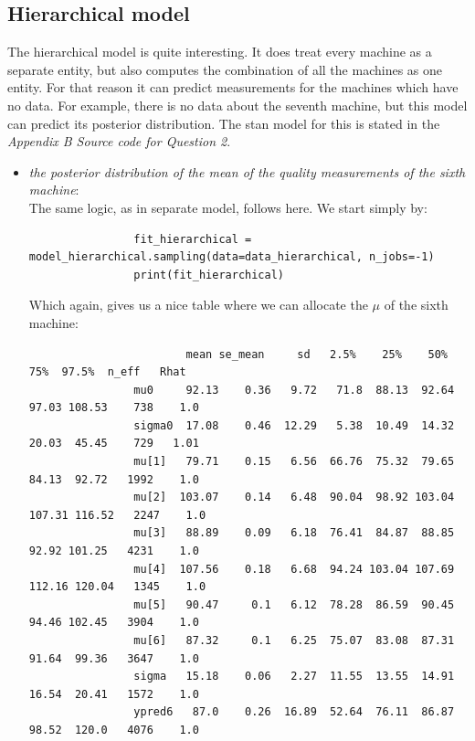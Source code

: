 \documentclass[11pt,a4paper,english]{article}
\begin{document}
        \subsection{Hierarchical model}
          The hierarchical model is quite interesting. It does treat every machine as a separate entity, but also computes the combination of all the machines as one entity. For that reason it can predict measurements for the machines which have no data. For example, there is no data about the seventh machine, but this model can predict its posterior distribution. The stan model for this is stated in the \textit{Appendix B  Source code for Question 2}.

          \begin{itemize}
            \item \textit{the posterior distribution of the mean of the quality measurements of the sixth machine}: \\
              The same logic, as in separate model, follows here. We start simply by:
              \begin{verbatim}
                fit_hierarchical = model_hierarchical.sampling(data=data_hierarchical, n_jobs=-1)
                print(fit_hierarchical)
              \end{verbatim}
              Which again, gives us a nice table where we can allocate the $\mu$ of the sixth machine:
              \begin{verbatim}
                        mean se_mean     sd   2.5%    25%    50%    75%  97.5%  n_eff   Rhat
                mu0     92.13    0.36   9.72   71.8  88.13  92.64  97.03 108.53    738    1.0
                sigma0  17.08    0.46  12.29   5.38  10.49  14.32  20.03  45.45    729   1.01
                mu[1]   79.71    0.15   6.56  66.76  75.32  79.65  84.13  92.72   1992    1.0
                mu[2]  103.07    0.14   6.48  90.04  98.92 103.04 107.31 116.52   2247    1.0
                mu[3]   88.89    0.09   6.18  76.41  84.87  88.85  92.92 101.25   4231    1.0
                mu[4]  107.56    0.18   6.68  94.24 103.04 107.69 112.16 120.04   1345    1.0
                mu[5]   90.47     0.1   6.12  78.28  86.59  90.45  94.46 102.45   3904    1.0
                mu[6]   87.32     0.1   6.25  75.07  83.08  87.31  91.64  99.36   3647    1.0
                sigma   15.18    0.06   2.27  11.55  13.55  14.91  16.54  20.41   1572    1.0
                ypred6   87.0    0.26  16.89  52.64  76.11  86.87  98.52  120.0   4076    1.0

\end{verbatim}
\end{itemize}
\end{document}
